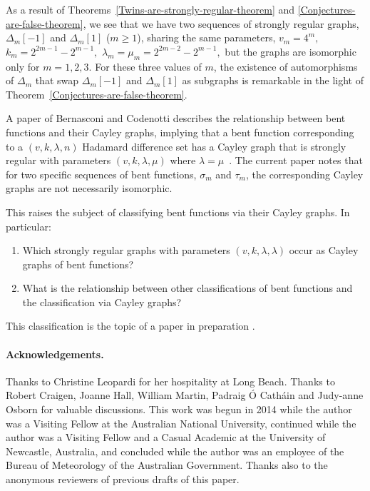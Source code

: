 \documentclass[12pt,a4paper]{article}
\begin{document}
As a result of Theorems~\ref{Twins-are-strongly-regular-theorem} and \ref{Conjectures-are-false-theorem},
we see that we have two sequences of strongly regular graphs, $\varDelta_m[-1]$ and $\varDelta_m[1]$ ($m \geqslant 1$),
sharing the same parameters, 
$v_m = 4^m,$ $k_m = 2^{2 m - 1} - 2^{m - 1},$ $\lambda_m=\mu_m=2^{2 m - 2} - 2^{m - 1},$
but the graphs are isomorphic only for $m=1, 2, 3$.
For these three values of $m$, the existence of
automorphisms of $\varDelta_m$ that swap $\varDelta_m[-1]$ and $\varDelta_m[1]$ 
as subgraphs \cite[Table 1]{Leo14Constructions}
is remarkable in the light of Theorem~\ref{Conjectures-are-false-theorem}.

A paper of Bernasconi and Codenotti describes the relationship between bent functions and
their Cayley graphs, implying that a bent function corresponding to a $(v,k,\lambda,n)$ Hada\-mard difference set has a Cayley graph 
that is strongly regular with parameters $(v,k,\lambda,\mu)$ where $\lambda=\mu$~\cite[Lemma 12]{BerC99}.
The current paper notes that for two specific sequences of bent functions, $\sigma_m$ and $\tau_m$,
the corresponding Cayley graphs are not necessarily isomorphic.

This raises the subject of classifying bent functions via their Cayley graphs.
In particular:
\begin{enumerate}
\item Which strongly regular graphs with parameters $(v,k,\lambda,\lambda)$ occur as Cayley graphs of bent functions?
\item What is the relationship between other classifications of bent functions and the classification via Cayley graphs?
\end{enumerate}
This classification is the topic of a paper in preparation \cite{Leo16Classifying}.

\paragraph*{Acknowledgements.}

Thanks to Christine Leopardi for her hospitality at Long Beach.
Thanks to Robert Craigen, Joanne Hall, William Martin,
Padraig {\'O} Cath{\'a}in and Judy-anne Osborn for valuable discussions.
This work was begun in 2014 while the author was a Visiting Fellow at the Australian National University, 
continued while the author was a Visiting Fellow and a Casual Academic at the University of Newcastle, Australia,
and concluded while the author was an employee of the Bureau of Meteorology of the Australian Government.
Thanks also to the anonymous reviewers of previous drafts of this paper.








%
\end{document}
